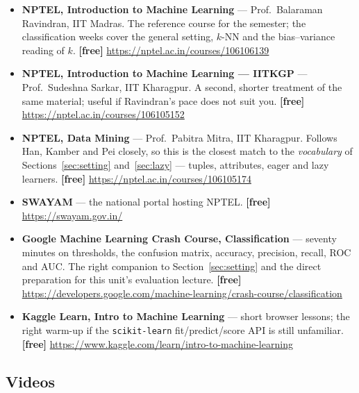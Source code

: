 \documentclass[11pt]{article}
\begin{document}
\begin{sloppypar}
\begin{itemize}[leftmargin=*]
  \item \textbf{NPTEL, Introduction to Machine Learning} --- Prof.\ Balaraman
    Ravindran, IIT Madras. The reference course for the semester; the
    classification weeks cover the general setting, $k$-NN and the
    bias--variance reading of $k$. \textbf{[free]}
    \url{https://nptel.ac.in/courses/106106139}
  \item \textbf{NPTEL, Introduction to Machine Learning --- IITKGP} ---
    Prof.\ Sudeshna Sarkar, IIT Kharagpur. A second, shorter treatment of the
    same material; useful if Ravindran's pace does not suit you.
    \textbf{[free]} \url{https://nptel.ac.in/courses/106105152}
  \item \textbf{NPTEL, Data Mining} --- Prof.\ Pabitra Mitra, IIT Kharagpur.
    Follows Han, Kamber and Pei closely, so this is the closest match to the
    \emph{vocabulary} of Sections~\ref{sec:setting} and~\ref{sec:lazy} ---
    tuples, attributes, eager and lazy learners. \textbf{[free]}
    \url{https://nptel.ac.in/courses/106105174}
  \item \textbf{SWAYAM} --- the national portal hosting NPTEL. \textbf{[free]}
    \url{https://swayam.gov.in/}
  \item \textbf{Google Machine Learning Crash Course, Classification} ---
    seventy minutes on thresholds, the confusion matrix, accuracy, precision,
    recall, ROC and AUC. The right companion to Section~\ref{sec:setting} and
    the direct preparation for this unit's evaluation lecture. \textbf{[free]}
    \url{https://developers.google.com/machine-learning/crash-course/classification}
  \item \textbf{Kaggle Learn, Intro to Machine Learning} --- short browser
    lessons; the right warm-up if the \texttt{scikit-learn} fit/predict/score
    API is still unfamiliar. \textbf{[free]}
    \url{https://www.kaggle.com/learn/intro-to-machine-learning}
\end{itemize}
\end{sloppypar}

\subsection*{Videos}
\end{document}
